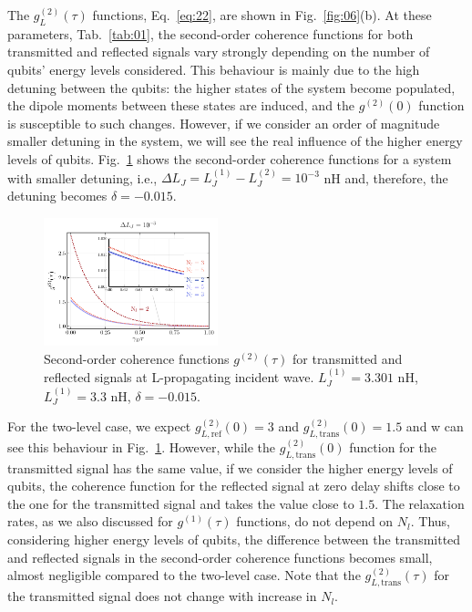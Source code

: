 \documentclass[lettersize,journal]{IEEEtran}
\begin{document}
The $g^{(2)}_L(\tau)$ functions, Eq.~\ref{eq:22}, are shown in Fig.~\ref{fig:06}(b).
At these parameters, Tab.~\ref{tab:01}, the second-order coherence functions for both transmitted and reflected signals vary strongly depending on the number of qubits' energy levels considered.
This behaviour is mainly due to the high detuning between the qubits: the higher states of the system become populated, the dipole moments between these states are induced, and the $g^{(2)}(0)$ function is susceptible to such changes.
However, if we consider an order of magnitude smaller detuning in the system, we will see the real influence of the higher energy levels of qubits.
Fig.~\ref{fig:06_1} shows the second-order coherence functions for a system with smaller detuning, i.e., $\Delta L_J = L_J^{(1)} - L_J^{(2)} = 10^{-3}$ nH and, therefore, the detuning becomes $\delta = -0.015$.
\begin{figure}[h]
    \centering
    \includegraphics[width=0.45\textwidth]{fig_4_1}
    \caption{Second-order coherence functions $g^{(2)}(\tau)$ for transmitted and reflected signals at L-propagating incident wave. $L_J^{(1)} = 3.301$ nH, $L_J^{(1)} = 3.3$ nH, $\delta = -0.015$.}
    \label{fig:06_1}
\end{figure}
For the two-level case, we expect $g^{(2)}_{L, \mathrm{ref}}(0) = 3$ and $g^{(2)}_{L, \mathrm{trans}}(0) = 1.5$ and w can see this behaviour in Fig.~\ref{fig:06_1}.
However, while the $g^{(2)}_{L, \mathrm{trans}}(0)$ function for the transmitted signal has the same value, if we consider the higher energy levels of qubits, the coherence function for the reflected signal at zero delay shifts close to the one for the transmitted signal and takes the value close to $1.5$.
The relaxation rates, as we also discussed for $g^{(1)}(\tau)$ functions, do not depend on $N_l$.
Thus, considering higher energy levels of qubits, the difference between the transmitted and reflected signals in the second-order coherence functions becomes small, almost negligible compared to the two-level case.
Note that the $g^{(2)}_{L, \mathrm{trans}}(\tau)$ for the transmitted signal does not change with increase in $N_l$.
\end{document}
